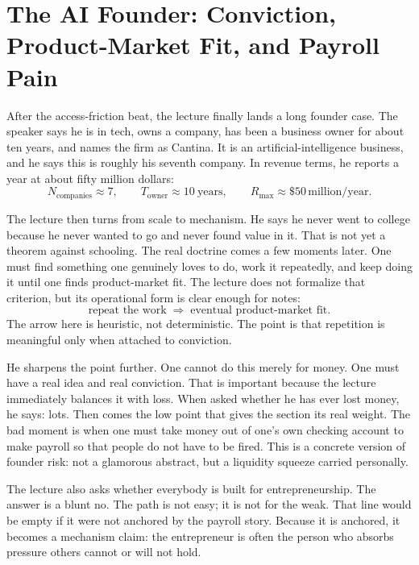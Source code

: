 \section{The AI Founder: Conviction, Product-Market Fit, and Payroll Pain}

After the access-friction beat, the lecture finally lands a long founder case. The speaker says he is in tech, owns a company, has been a business owner for about ten years, and names the firm as Cantina. It is an artificial-intelligence business, and he says this is roughly his seventh company. In revenue terms, he reports a year at about fifty million dollars:
\begin{equation}
N_{\text{companies}} \approx 7,\qquad
T_{\text{owner}} \approx 10\ \text{years},\qquad
R_{\max} \approx \$50\,\text{million/year}.
\end{equation}

The lecture then turns from scale to mechanism. He says he never went to college because he never wanted to go and never found value in it. That is not yet a theorem against schooling. The real doctrine comes a few moments later. One must find something one genuinely loves to do, work it repeatedly, and keep doing it until one finds product-market fit. The lecture does not formalize that criterion, but its operational form is clear enough for notes:
\begin{equation}
\text{repeat the work} \;\Rightarrow\; \text{eventual product-market fit}.
\end{equation}
The arrow here is heuristic, not deterministic. The point is that repetition is meaningful only when attached to conviction.

He sharpens the point further. One cannot do this merely for money. One must have a real idea and real conviction. That is important because the lecture immediately balances it with loss. When asked whether he has ever lost money, he says: lots. Then comes the low point that gives the section its real weight. The bad moment is when one must take money out of one's own checking account to make payroll so that people do not have to be fired. This is a concrete version of founder risk: not a glamorous abstract, but a liquidity squeeze carried personally.

The lecture also asks whether everybody is built for entrepreneurship. The answer is a blunt no. The path is not easy; it is not for the weak. That line would be empty if it were not anchored by the payroll story. Because it is anchored, it becomes a mechanism claim: the entrepreneur is often the person who absorbs pressure others cannot or will not hold.


